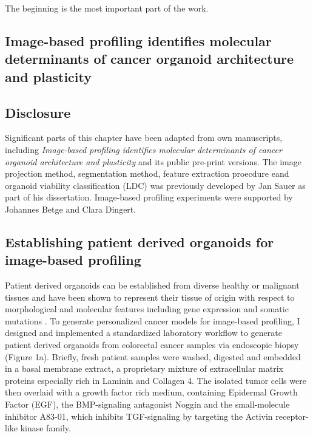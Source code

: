 \begin{savequote}[75mm]
The beginning is the most important part of the work.
\end{savequote}

\begin{flushleft}
\chapter{Image-based profiling identifies molecular determinants of cancer organoid architecture and plasticity}

\newpage

\section{Disclosure}
Significant parts of this chapter have been adapted from own manuscripts, including \textit{Image-based profiling identifies molecular determinants of cancer organoid architecture and plasticity} \cite{Betge2019MultiparametricOrganoids} and its public pre-print versions. The image projection method, segmentation method, feature extraction proecdure eand organoid viability classification (LDC) was previously developed by Jan Sauer as part of his dissertation. Image-based profiling experiments were supported by Johannes Betge and Clara Dingert. 

\section{Establishing patient derived organoids for image-based profiling}

Patient derived organoids can be established from diverse healthy or malignant tissues and have been shown to represent their tissue of origin with respect to morphological and molecular features including gene expression and somatic mutations \cite{Fujii:2016jo, Weeber2015-sn, Van_De_Wetering2015-ko, Sato:2011-1h,  Broutier2017-wg}. To generate personalized cancer models for image-based profiling, I designed and implemented a standardized laboratory workflow to generate patient derived organoids from colorectal cancer samples via endoscopic biopsy (Figure 1a). Briefly, fresh patient samples were washed, digested and embedded in a basal membrane extract, a proprietary mixture of extracellular matrix proteins especially rich in Laminin and Collagen 4. The isolated tumor cells were then overlaid with a growth factor rich medium, containing Epidermal Growth Factor (EGF), the BMP-signaling antagonist Noggin and the small-molecule inhibitor A83-01, which inhibits TGF\beta-signaling by targeting the Activin receptor-like kinase family.


\end{flushleft}
